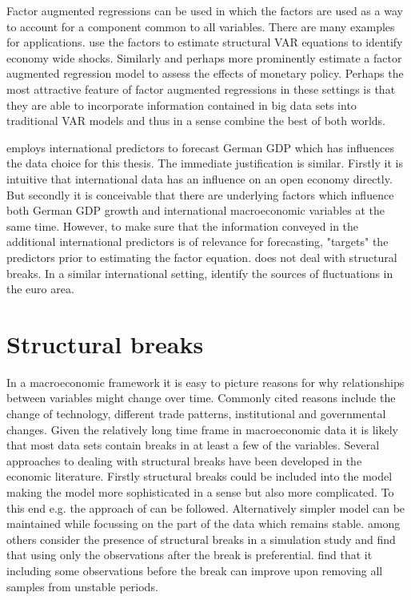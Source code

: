 \documentclass[12pt]{article}
\begin{document}
Factor augmented regressions can be used in which the factors are used as a way to account for a component common to all variables. There are many examples for applications. \citet{forni1998let} use the factors to estimate structural VAR equations to identify economy wide shocks.
Similarly and perhaps more prominently \citet{bernanke2004measuring} estimate a factor augmented regression model to assess the effects of monetary policy. Perhaps the most attractive feature of factor augmented regressions in these settings is that they are able to incorporate information contained in big data sets into traditional VAR models and thus in a sense combine the best of both worlds.


\citet{schumacher2010factor} employs international predictors to forecast German GDP which has influences the data choice for this thesis. The immediate justification is similar. Firstly it is intuitive that international data has an influence on an open economy directly. But secondly it is conceivable that there are underlying factors which influence both German GDP growth and international macroeconomic variables at the same time. However, to make sure that the information conveyed in the additional international predictors is of relevance for forecasting, \citet{schumacher2010factor} "targets" the predictors prior to estimating the factor equation. \citet{schumacher2010factor} does not deal with structural breaks.
In a similar international setting, \citet{eickmeier2006synchronized} identify the sources of fluctuations in the euro area. 


\section{Structural breaks}
In a macroeconomic framework it is easy to picture reasons for why relationships between variables might change over time. Commonly cited reasons include the change of technology, different trade patterns, institutional and governmental changes. Given the relatively long time frame in macroeconomic data it is likely that most data sets contain breaks in at least a few of the variables. Several approaches to dealing with structural breaks have been developed in the economic literature. Firstly structural breaks could be included into the model making the model more sophisticated in a sense but also more complicated. To this end e.g. the approach of \citet{bai2003computation} can be followed. Alternatively simpler model can be maintained while focussing on the part of the data which remains stable. \citet{banerjee2007forecasting} among others consider the presence of structural breaks in a simulation study and find that using only the observations after the break is preferential. \citet{pesaran2007selection} find that it including some observations before the break can improve upon removing all samples from unstable periods.
\end{document}
